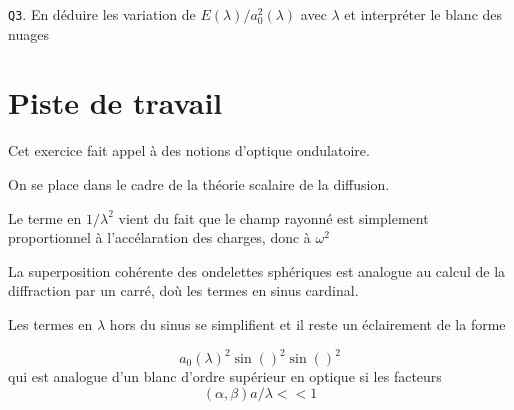 \documentclass[letterpaper, 11pt]{article}
\begin{document}
\texttt{Q3}. En déduire les variation de \(E(\lambda)/a_0^2(\lambda)\) avec \(\lambda\) et interpréter le blanc des nuages

\newpage

\section{Piste de travail}
\label{sec:org246bac6}


Cet exercice fait appel à des notions d'optique ondulatoire.

On se place dans le cadre de la théorie scalaire de la diffusion.

Le terme en \(1/\lambda^2\) vient du fait que le champ rayonné est simplement proportionnel à l'accélaration des charges, donc à \(\omega^2\)

La superposition cohérente des ondelettes sphériques est analogue au calcul de la diffraction par un carré, doù les termes en sinus cardinal. 

Les termes en \(\lambda\) hors du sinus se simplifient et il reste un éclairement de la forme 

$$ a_0(\lambda)^2 \sin()^2 \sin()^2 $$  qui est analogue d'un blanc d'ordre supérieur en optique si les facteurs $$ (\alpha,\beta) a / \lambda   <<  1 $$ 
\end{document}
